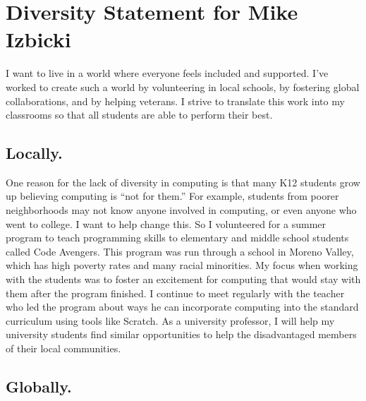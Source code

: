 \documentclass[12pt]{article}
\begin{document}
\section*{Diversity Statement for Mike Izbicki}

I want to live in a world where everyone feels included and supported.
I've worked to create such a world by volunteering in local schools, 
by fostering global collaborations, 
and by helping veterans.
I strive to translate this work into my classrooms so that all students are able to perform their best.

\vspace{-0.15in}
\subsection*{Locally.}

One reason for the lack of diversity in computing is that many K12 students grow up believing computing is ``not for them.''
For example, students from poorer neighborhoods may not know anyone involved in computing,
or even anyone who went to college.
I want to help change this.
So I volunteered for a summer program to teach programming skills to elementary and middle school students called Code Avengers.
This program was run through a school in Moreno Valley,
which has high poverty rates and many racial minorities.
My focus when working with the students was to foster an excitement for computing that would stay with them after the program finished.
I continue to meet regularly with the teacher who led the program about ways he can incorporate computing into the standard curriculum using tools like Scratch. 
As a university professor, 
I will help my university students find similar opportunities to help the disadvantaged members of their local communities.

\vspace{-0.15in}
\subsection*{Globally.}
\end{document}

